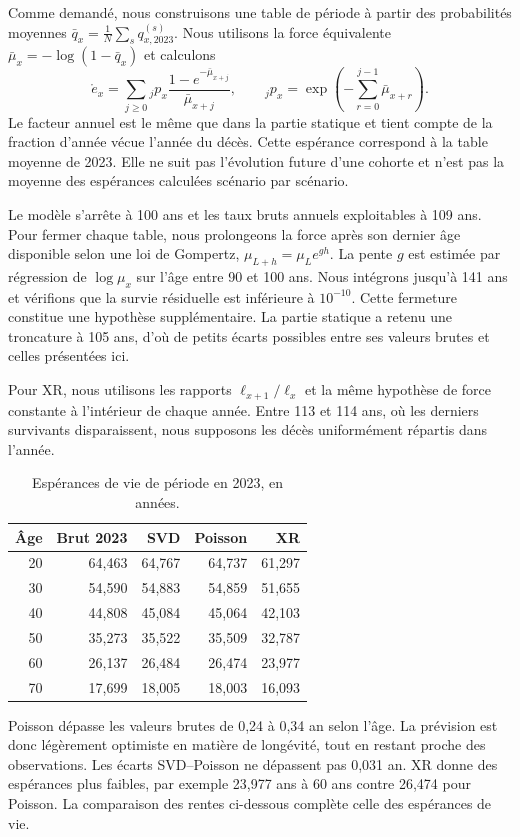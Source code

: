 \documentclass[11pt,a4paper]{article}
\begin{document}
Comme demandé, nous construisons une table de période à partir des probabilités moyennes $\bar q_x=\frac1N\sum_s q_{x,2023}^{(s)}$. Nous utilisons la force équivalente $\bar\mu_x=-\log(1-\bar q_x)$ et calculons
\[
\mathring e_x=\sum_{j\geq0}{}_jp_x\frac{1-e^{-\bar\mu_{x+j}}}{\bar\mu_{x+j}},
\qquad {}_jp_x=\exp\left(-\sum_{r=0}^{j-1}\bar\mu_{x+r}\right).
\]
Le facteur annuel est le même que dans la partie statique et tient compte de la fraction d'année vécue l'année du décès. Cette espérance correspond à la table moyenne de 2023. Elle ne suit pas l'évolution future d'une cohorte et n'est pas la moyenne des espérances calculées scénario par scénario.

Le modèle s'arrête à 100 ans et les taux bruts annuels exploitables à 109 ans. Pour fermer chaque table, nous prolongeons la force après son dernier âge disponible selon une loi de Gompertz, $\mu_{L+h}=\mu_L e^{gh}$. La pente $g$ est estimée par régression de $\log\mu_x$ sur l'âge entre 90 et 100 ans. Nous intégrons jusqu'à 141 ans et vérifions que la survie résiduelle est inférieure à $10^{-10}$. Cette fermeture constitue une hypothèse supplémentaire. La partie statique a retenu une troncature à 105 ans, d'où de petits écarts possibles entre ses valeurs brutes et celles présentées ici.

Pour XR, nous utilisons les rapports $\ell_{x+1}/\ell_x$ et la même hypothèse de force constante à l'intérieur de chaque année. Entre 113 et 114 ans, où les derniers survivants disparaissent, nous supposons les décès uniformément répartis dans l'année.

\begin{table}[H]\centering\small
\caption{Espérances de vie de période en 2023, en années.}
\begin{tabular}{rrrrr}\toprule
Âge & Brut 2023 & SVD & Poisson & XR\\\midrule
20 & 64,463 & 64,767 & 64,737 & 61,297\\
30 & 54,590 & 54,883 & 54,859 & 51,655\\
40 & 44,808 & 45,084 & 45,064 & 42,103\\
50 & 35,273 & 35,522 & 35,509 & 32,787\\
60 & 26,137 & 26,484 & 26,474 & 23,977\\
70 & 17,699 & 18,005 & 18,003 & 16,093\\\bottomrule
\end{tabular}\label{tab:vie}
\end{table}

Poisson dépasse les valeurs brutes de 0,24 à 0,34 an selon l'âge. La prévision est donc légèrement optimiste en matière de longévité, tout en restant proche des observations. Les écarts SVD--Poisson ne dépassent pas 0,031 an. XR donne des espérances plus faibles, par exemple 23,977 ans à 60 ans contre 26,474 pour Poisson. La comparaison des rentes ci-dessous complète celle des espérances de vie.
\end{document}
